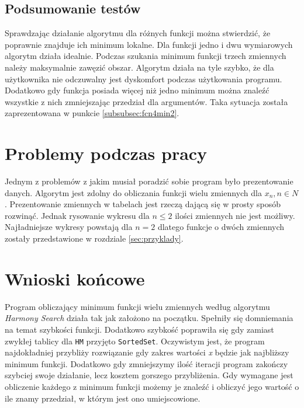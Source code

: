 \documentclass[10pt, a4paper]{article}
\begin{document}
\subsection{Podsumowanie testów}
\label{subsec:podsumowanietestow}
Sprawdzając działanie algorytmu dla różnych funkcji można stwierdzić, że poprawnie znajduje ich minimum lokalne. Dla funkcji jedno i dwu wymiarowych algorytm działa idealnie. Podczas szukania minimum funkcji trzech zmiennych należy maksymalnie zawęzić obszar. Algorytm działa na tyle szybko, że dla użytkownika nie odczuwalny jest dyskomfort podczas użytkowania programu. Dodatkowo gdy funkcja posiada więcej niż jedno minimum można znaleźć wszystkie z nich zmniejszając przedział dla argumentów. Taka sytuacja została zaprezentowana w punkcie \ref{subsubsec:fcn4min2}. 

\section{Problemy podczas pracy}
\label{sec:problemy}
Jednym z problemów z jakim musiał poradzić sobie program było prezentowanie danych. Algorytm jest zdolny do obliczania funkcji wielu zmiennych dla {\em $x_{n} , n \in N$}. Prezentowanie zmiennych w tabelach jest rzeczą dającą się w prosty sposób rozwinąć. Jednak rysowanie wykresu dla $n \leq 2$ ilości zmiennych nie jest możliwy. Najładniejsze wykresy powstają dla $n = 2$ dlatego funkcje o dwóch zmiennych zostały przedstawione w rozdziale \ref{sec:przyklady}. \\

\section{Wnioski końcowe}
\label{sec:wnioski}
Program obliczający minimum funkcji wielu zmiennych według algorytmu {\em Harmony Search} działa tak jak założono na początku. Spełniły się domniemania na temat szybkości funkcji. Dodatkowo szybkość poprawiła się gdy zamiast zwykłej tablicy dla {\tt HM} przyjęto {\tt SortedSet}. Oczywistym jest, że program najdokładniej przybliży rozwiązanie gdy zakres wartości {\em x} będzie jak najbliższy minimum funkcji. Dodatkowo gdy zmniejszymy ilość iteracji program zakończy szybciej swoje działanie, lecz kosztem gorszego przybliżenia. Gdy wymagane jest obliczenie każdego z minimum funkcji możemy je znaleźć i obliczyć jego wartość o ile znamy przedział, w którym jest ono umiejscowione. 

\newpage
{}


\end{document}
